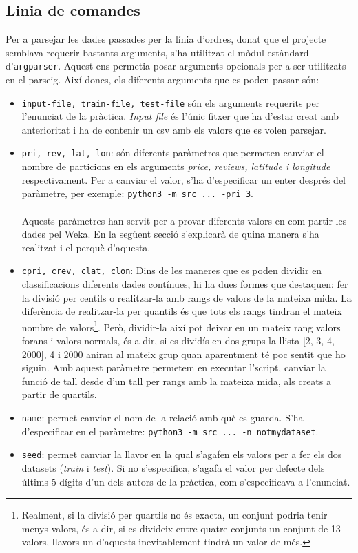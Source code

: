 \subsection{Linia de comandes}
Per a parsejar les dades passades per la línia d'ordres, donat que el projecte semblava
requerir bastants arguments, s'ha utilitzat el mòdul estàndard d'\texttt{argparser}. Aquest
ens permetia posar arguments opcionals per a ser utilitzats en el parseig. Així doncs, els
diferents arguments que es poden passar són:
\begin{itemize}
	\item \texttt{input-file, train-file, test-file} són els arguments requerits per l'enunciat de la pràctica.
		\textit{Input file} és l'únic fitxer que ha d'estar creat amb anterioritat i ha de contenir un 
		csv amb els valors que es volen parsejar. 
	\item \texttt{pri, rev, lat, lon}: són diferents paràmetres que permeten canviar el nombre de particions en els arguments \textit{price, reviews, latitude i longitude} respectivament. Per a
	canviar el valor, s'ha d'especificar un enter després del paràmetre, per exemple:
	\verb|python3 -m src ... -pri 3|.\\
	\\
	Aquests paràmetres han servit per a provar diferents valors en com partir les dades pel Weka.
	En la següent secció s'explicarà de quina manera s'ha realitzat i el perquè d'aquesta.
	\item \texttt{cpri, crev, clat, clon}: Dins de les maneres que es poden dividir en classificacions 
	diferents dades contínues, hi ha dues formes que destaquen: fer la divisió per centils o realitzar-la
	amb rangs de valors de la mateixa mida. La diferència de realitzar-la per quantils és que tots
	els rangs tindran el mateix nombre de valors\footnote{Realment, si la divisió per quartils no
	és exacta, un conjunt podria tenir menys valors, és a dir, si es divideix entre quatre conjunts un
	conjunt de 13 valors, llavors un d'aquests inevitablement tindrà un valor de més.}. Però, dividir-la
	així pot deixar en un mateix rang valors forans i valors normals, és a dir, si es dividís en dos
	grups la llista [2, 3, 4, 2000], 4 i 2000 aniran al mateix grup quan aparentment té poc sentit
	que ho siguin. Amb aquest paràmetre permetem en executar l'script, canviar la funció de tall 
	desde d'un tall per rangs amb la mateixa mida, als creats a partir de quartils.
	\item \texttt{name}: permet canviar el nom de la relació amb què es guarda. S'ha d'especificar
	en el paràmetre: \verb|python3 -m src ... -n notmydataset|.
	\item \texttt{seed}: permet canviar la llavor en la qual s'agafen els valors per a fer els dos
	datasets (\textit{train} i \textit{test}). Si no s'especifica, s'agafa el valor per defecte 
	dels últims 5 dígits d'un dels autors de la pràctica, com s'especificava a l'enunciat.
\end{itemize}
